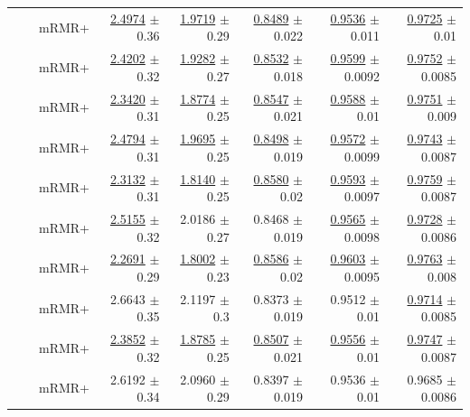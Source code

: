 \begin{longtable}{llp{}rrrrr}
 &  & mRMR+ & \underline{2.4974} {\scriptsize $\pm$ 0.36} & \underline{1.9719} {\scriptsize $\pm$ 0.29} & \underline{0.8489} {\scriptsize $\pm$ 0.022} & \underline{0.9536} {\scriptsize $\pm$ 0.011} & \underline{0.9725} {\scriptsize $\pm$ 0.01} \\
 &  & mRMR+ & \underline{2.4202} {\scriptsize $\pm$ 0.32} & \underline{1.9282} {\scriptsize $\pm$ 0.27} & \underline{0.8532} {\scriptsize $\pm$ 0.018} & \underline{0.9599} {\scriptsize $\pm$ 0.0092} & \underline{0.9752} {\scriptsize $\pm$ 0.0085} \\
 &  & mRMR+ & \underline{2.3420} {\scriptsize $\pm$ 0.31} & \underline{1.8774} {\scriptsize $\pm$ 0.25} & \underline{0.8547} {\scriptsize $\pm$ 0.021} & \underline{0.9588} {\scriptsize $\pm$ 0.01} & \underline{0.9751} {\scriptsize $\pm$ 0.009} \\
 &  & mRMR+ & \underline{2.4794} {\scriptsize $\pm$ 0.31} & \underline{1.9695} {\scriptsize $\pm$ 0.25} & \underline{0.8498} {\scriptsize $\pm$ 0.019} & \underline{0.9572} {\scriptsize $\pm$ 0.0099} & \underline{0.9743} {\scriptsize $\pm$ 0.0087} \\
 &  & mRMR+ & \underline{2.3132} {\scriptsize $\pm$ 0.31} & \underline{1.8140} {\scriptsize $\pm$ 0.25} & \underline{0.8580} {\scriptsize $\pm$ 0.02} & \underline{0.9593} {\scriptsize $\pm$ 0.0097} & \underline{0.9759} {\scriptsize $\pm$ 0.0087} \\
 &  & mRMR+ & \underline{2.5155} {\scriptsize $\pm$ 0.32} & 2.0186 {\scriptsize $\pm$ 0.27} & 0.8468 {\scriptsize $\pm$ 0.019} & \underline{0.9565} {\scriptsize $\pm$ 0.0098} & \underline{0.9728} {\scriptsize $\pm$ 0.0086} \\
 &  & mRMR+ & \underline{2.2691} {\scriptsize $\pm$ 0.29} & \underline{1.8002} {\scriptsize $\pm$ 0.23} & \underline{0.8586} {\scriptsize $\pm$ 0.02} & \underline{0.9603} {\scriptsize $\pm$ 0.0095} & \underline{0.9763} {\scriptsize $\pm$ 0.008} \\
 &  & mRMR+ & 2.6643 {\scriptsize $\pm$ 0.35} & 2.1197 {\scriptsize $\pm$ 0.3} & 0.8373 {\scriptsize $\pm$ 0.019} & 0.9512 {\scriptsize $\pm$ 0.01} & \underline{0.9714} {\scriptsize $\pm$ 0.0085} \\
 &  & mRMR+ & \underline{2.3852} {\scriptsize $\pm$ 0.32} & \underline{1.8785} {\scriptsize $\pm$ 0.25} & \underline{0.8507} {\scriptsize $\pm$ 0.021} & \underline{0.9556} {\scriptsize $\pm$ 0.01} & \underline{0.9747} {\scriptsize $\pm$ 0.0087} \\
 &  & mRMR+ & 2.6192 {\scriptsize $\pm$ 0.34} & 2.0960 {\scriptsize $\pm$ 0.29} & 0.8397 {\scriptsize $\pm$ 0.019} & 0.9536 {\scriptsize $\pm$ 0.01} & 0.9685 {\scriptsize $\pm$ 0.0086} \\

\end{longtable}
